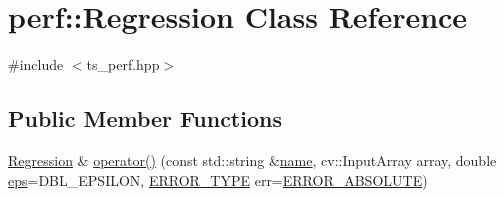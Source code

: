 \hypertarget{classperf_1_1Regression}{\section{perf\-:\-:Regression Class Reference}
\label{classperf_1_1Regression}
}


{\ttfamily \#include $<$ts\-\_\-perf.\-hpp$>$}

\subsection*{Public Member Functions}
\begin{DoxyCompactItemize}
\item 
\hyperlink{classperf_1_1Regression}{Regression} \& \hyperlink{classperf_1_1Regression_a99f28b203098fa5fb1fed5f6be8aa7ef}{operator()} (const std\-::string \&\hyperlink{core__c_8h_add928d8eb85ea33a25a67db3406d4887}{name}, cv\-::\-Input\-Array array, double \hyperlink{imgproc__c_8h_aabece9d4af1ab09d2f85ade473757e32}{eps}=D\-B\-L\-\_\-\-E\-P\-S\-I\-L\-O\-N, \hyperlink{namespaceperf_afd1ef30dd7868637f168926100ed2ba8}{E\-R\-R\-O\-R\-\_\-\-T\-Y\-P\-E} err=\hyperlink{namespaceperf_afd1ef30dd7868637f168926100ed2ba8a1f890b566341b120aa632095d9a8259f}{E\-R\-R\-O\-R\-\_\-\-A\-B\-S\-O\-L\-U\-T\-E})
\end{DoxyCompactItemize}
